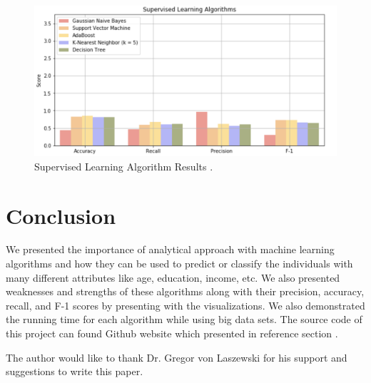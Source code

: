 \documentclass[sigconf]{acmart}
\begin{document}
\begin{figure}[!ht]
  \centering
      \includegraphics[width=\columnwidth]{images/result-score.png}
  \caption{Supervised Learning Algorithm Results \cite{Borga2017}.}\label{fig:result-algo}
\end{figure}


\section{Conclusion}

We presented the importance of analytical approach with machine learning algorithms and how they can be used to predict or classify the individuals with many different attributes like age, education, income, etc. We also presented weaknesses and strengths of these algorithms along with their precision, accuracy, recall, and F-1 scores by presenting with the visualizations. We also demonstrated the running time for each algorithm while using big data sets. The source code of this project can found Github website which presented in reference section \cite{Borga2017}.





\begin{acks}

The author would like to thank Dr. Gregor von Laszewski for his support and suggestions to write this paper.

\end{acks}


 
\end{document}
